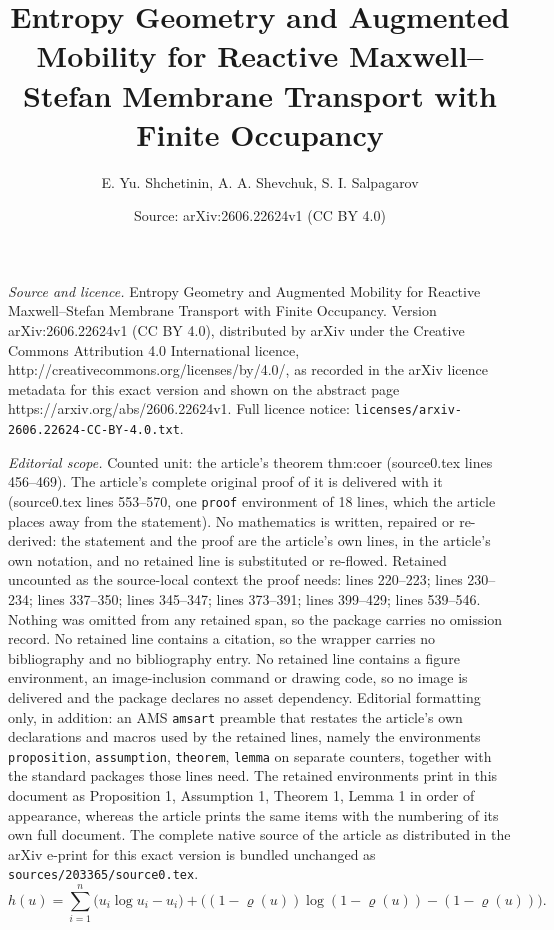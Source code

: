 \documentclass[10pt,a4paper]{amsart}
\title{Entropy Geometry and Augmented Mobility for Reactive Maxwell--Stefan Membrane Transport with Finite Occupancy}
\author{E. Yu. Shchetinin, A. A. Shevchuk, S. I. Salpagarov}
\date{Source: arXiv:2606.22624v1 (CC BY 4.0)}
\begin{document}
\maketitle

\noindent\emph{Source and licence.} Entropy Geometry and Augmented Mobility for Reactive Maxwell--Stefan Membrane Transport with Finite Occupancy. Version arXiv:2606.22624v1 (CC BY 4.0), distributed by arXiv under the Creative Commons Attribution 4.0 International licence, http://creativecommons.org/licenses/by/4.0/, as recorded in the arXiv licence metadata for this exact version and shown on the abstract page https://arxiv.org/abs/2606.22624v1. Full licence notice: \texttt{licenses/arxiv-2606.22624-CC-BY-4.0.txt}.\par\smallskip

\noindent\textit{Editorial scope.} Counted unit: the article's theorem thm:coer (source0.tex lines 456--469). The article's complete original proof of it is delivered with it (source0.tex lines 553--570, one \texttt{proof} environment of 18 lines, which the article places away from the statement). No mathematics is written, repaired or re-derived: the statement and the proof are the article's own lines, in the article's own notation, and no retained line is substituted or re-flowed.  Retained uncounted as the source-local context the proof needs: lines 220--223; lines 230--234; lines 337--350; lines 345--347; lines 373--391; lines 399--429; lines 539--546.  Nothing was omitted from any retained span, so the package carries no omission record.  No retained line contains a citation, so the wrapper carries no bibliography and no bibliography entry.  No retained line contains a figure environment, an image-inclusion command or drawing code, so no image is delivered and the package declares no asset dependency.  Editorial formatting only, in addition: an AMS \texttt{amsart} preamble that restates the article's own declarations and macros used by the retained lines, namely the environments \texttt{proposition}, \texttt{assumption}, \texttt{theorem}, \texttt{lemma} on separate counters, together with the standard packages those lines need.  The retained environments print in this document as Proposition 1, Assumption 1, Theorem 1, Lemma 1 in order of appearance, whereas the article prints the same items with the numbering of its own full document.  The complete native source of the article as distributed in the arXiv e-print for this exact version is bundled unchanged as \texttt{sources/203365/source0.tex}.
\begin{equation}\label{eq:h}
  h(u) = \sum_{i=1}^n \bigl(u_i\log u_i - u_i\bigr)
        + \bigl((1-\varrho(u))\log(1-\varrho(u)) - (1-\varrho(u))\bigr).
\end{equation}
\end{document}
